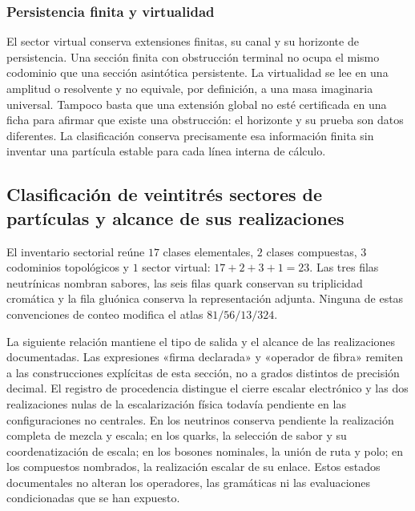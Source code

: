 \subsubsection{Persistencia finita y virtualidad}

El sector virtual conserva extensiones finitas, su canal y su horizonte
de persistencia. Una sección finita con obstrucción terminal no ocupa
el mismo codominio que una sección asintótica persistente. La
virtualidad se lee en una amplitud o resolvente y no equivale, por
definición, a una masa imaginaria universal. Tampoco basta que una
extensión global no esté certificada en una ficha para afirmar que
existe una obstrucción: el horizonte y su prueba son datos diferentes.
La clasificación conserva precisamente esa información finita sin
inventar una partícula estable para cada línea interna de cálculo.

\subsection{Clasificación de veintitrés sectores de partículas y alcance de sus realizaciones}
\label{vi:subsec:23-clases}

El inventario sectorial reúne \(17\) clases elementales, \(2\) clases
compuestas, \(3\) codominios topológicos y \(1\) sector virtual:
\(17+2+3+1=23\). Las tres filas neutrínicas nombran sabores, las
seis filas quark conservan su triplicidad cromática y la fila gluónica
conserva la representación adjunta. Ninguna de estas convenciones de
conteo modifica el atlas \(81/56/13/324\).

La siguiente relación mantiene el tipo de salida y el alcance de las
realizaciones documentadas. Las expresiones «firma declarada» y
«operador de fibra» remiten a las construcciones explícitas de esta
sección, no a grados distintos de precisión decimal.
El registro de procedencia distingue el cierre escalar electrónico y
las dos realizaciones nulas de la escalarización física todavía pendiente en
las configuraciones no centrales. En los neutrinos conserva pendiente la
realización completa de mezcla y escala; en los quarks, la selección de
sabor y su coordenatización de escala; en los bosones nominales, la unión de ruta
y polo; en los compuestos nombrados, la realización escalar de su
enlace. Estos estados documentales no alteran los operadores, las
gramáticas ni las evaluaciones condicionadas que se han expuesto.

